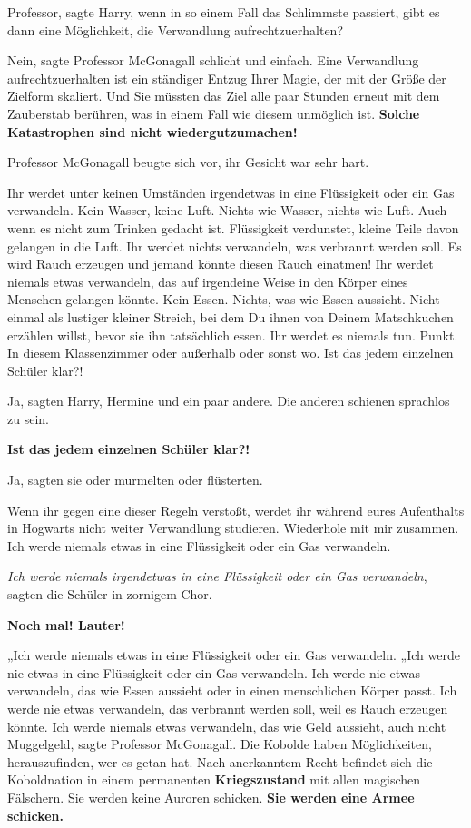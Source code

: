 \glqq{}Professor\grqq{}, sagte Harry, \glqq{}wenn in so einem Fall das Schlimmste
passiert, gibt es dann eine Möglichkeit, die Verwandlung
aufrechtzuerhalten?\grqq{}

\glqq{}Nein\grqq{}, sagte Professor McGonagall schlicht und einfach. \glqq{}Eine
Verwandlung aufrechtzuerhalten ist ein ständiger Entzug Ihrer Magie, der mit der
Größe der Zielform skaliert. Und Sie müssten das Ziel alle paar Stunden erneut
mit dem Zauberstab berühren, was in einem Fall wie diesem unmöglich ist.
\textbf{Solche Katastrophen sind nicht wiedergutzumachen!}\grqq{}

Professor McGonagall beugte sich vor, ihr Gesicht war sehr hart.

\glqq{}Ihr werdet unter keinen Umständen irgendetwas in eine Flüssigkeit oder ein
Gas verwandeln. Kein Wasser, keine Luft. Nichts wie Wasser, nichts wie Luft.
Auch wenn es nicht zum Trinken gedacht ist. Flüssigkeit verdunstet, kleine Teile
davon gelangen in die Luft. Ihr werdet nichts verwandeln, was verbrannt werden
soll. Es wird Rauch erzeugen und jemand könnte diesen Rauch einatmen! Ihr werdet
niemals etwas verwandeln, das auf irgendeine Weise in den Körper eines Menschen
gelangen könnte. Kein Essen. Nichts, was wie Essen aussieht. Nicht einmal als
lustiger kleiner Streich, bei dem Du ihnen von Deinem Matschkuchen erzählen
willst, bevor sie ihn tatsächlich essen. Ihr werdet es niemals tun. Punkt. In
diesem Klassenzimmer oder außerhalb oder sonst wo. Ist das jedem einzelnen
Schüler klar?!\grqq{}

\glqq{}Ja\grqq{}, sagten Harry, Hermine und ein paar andere. Die anderen
schienen sprachlos zu sein.

\textbf{\glqq{}Ist das jedem einzelnen Schüler klar?!\grqq{}}

\glqq{}Ja\grqq{}, sagten sie oder murmelten oder flüsterten.

\glqq{}Wenn ihr gegen eine dieser Regeln verstoßt, werdet ihr während eures
Aufenthalts in Hogwarts nicht weiter Verwandlung studieren. Wiederhole mit mir
zusammen. Ich werde niemals etwas in eine Flüssigkeit oder ein Gas
verwandeln.\grqq{}

\glqq{}\emph{Ich werde niemals irgendetwas in eine Flüssigkeit oder ein Gas
verwandeln}\grqq{}, sagten die Schüler in zornigem Chor.

\glqq{}\textbf{Noch mal! Lauter!}\grqq{}

„Ich werde niemals etwas in eine Flüssigkeit oder ein Gas verwandeln.\grqq{}
„Ich werde nie etwas in eine Flüssigkeit oder ein Gas verwandeln.\grqq{} \glqq
Ich werde nie etwas verwandeln, das wie Essen aussieht oder in einen
menschlichen Körper passt.\grqq{} \glqq{}Ich werde nie etwas verwandeln, das
verbrannt werden soll, weil es Rauch erzeugen könnte.\grqq{} \glqq{}Ich werde
niemals etwas verwandeln, das wie Geld aussieht, auch nicht Muggelgeld\grqq{},
sagte Professor McGonagall. \glqq{}Die Kobolde haben Möglichkeiten,
herauszufinden, wer es getan hat. Nach anerkanntem Recht befindet sich die
Koboldnation in einem permanenten \textbf{Kriegszustand} mit allen magischen
Fälschern. Sie werden keine Auroren schicken. \textbf{Sie werden eine Armee
schicken.}\grqq{}

